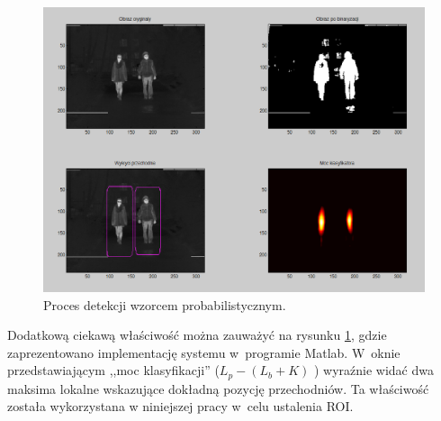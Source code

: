 \begin{figure}
\centering
\includegraphics[width=0.8\linewidth]{images/sim_window.png}
\caption[Proces detekcji wzorcem probabilistycznym.]{Proces detekcji wzorcem probabilistycznym. \cite{kankaing}}
\label{fig:sim_window}
\end{figure}

Dodatkową ciekawą właściwość można zauważyć na rysunku \ref{fig:sim_window}, gdzie zaprezentowano implementację systemu w~programie Matlab. 
W~oknie przedstawiającym ,,moc klasyfikacji'' ($L_p - (L_b + K)$ ) wyraźnie widać dwa maksima lokalne wskazujące dokładną pozycję przechodniów. 
Ta właściwość została wykorzystana w niniejszej pracy w~celu ustalenia ROI.



